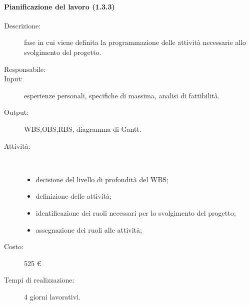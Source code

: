 \begin{description}
\paragraph{Pianificazione del lavoro (1.3.3)}
\begin{description}
\item[Descrizione:] fase in cui viene definita la programmazione delle attivit\`{a} necessarie allo svolgimento del progetto.
\item[Responsabile:] 
\item[Input:] esperienze personali, specifiche di massima, analisi di fattibilit\`{a}.
\item[Output:] WBS,OBS,RBS, diagramma di Gantt.
\item[Attività:]\mbox{}\\[-1.5\baselineskip]
	\begin{itemize}
	\item decisione del livello di profondit\`{a} del WBS;
	\item definizione delle attivit\`{a};
	\item identificazione dei ruoli necessari per lo svolgimento del progetto;
	\item assegnazione dei ruoli alle attivit\`{a};
	\end{itemize}
\item[Costo:] 525 \euro{}
\item[Tempi di realizzazione:] 4 giorni lavorativi.
\end{description}


\end{description}
